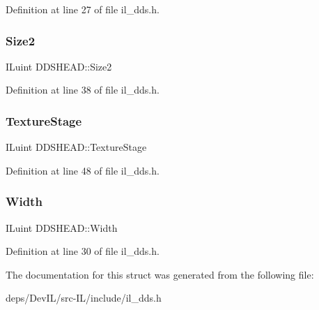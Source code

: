 Definition at line 27 of file il\+\_\+dds.\+h.

\mbox{\label{structDDSHEAD_ae4ee19a87a30c44498acc5f2354a80aa}} 
\subsubsection{\texorpdfstring{Size2}{Size2}}
{\footnotesize\ttfamily I\+Luint D\+D\+S\+H\+E\+A\+D\+::\+Size2}



Definition at line 38 of file il\+\_\+dds.\+h.

\mbox{\label{structDDSHEAD_a961a061539af2d45ffe7df0833b43c46}} 
\subsubsection{\texorpdfstring{Texture\+Stage}{TextureStage}}
{\footnotesize\ttfamily I\+Luint D\+D\+S\+H\+E\+A\+D\+::\+Texture\+Stage}



Definition at line 48 of file il\+\_\+dds.\+h.

\mbox{\label{structDDSHEAD_a5a91cf53282136fb6932a6bb6ab2a767}} 
\subsubsection{\texorpdfstring{Width}{Width}}
{\footnotesize\ttfamily I\+Luint D\+D\+S\+H\+E\+A\+D\+::\+Width}



Definition at line 30 of file il\+\_\+dds.\+h.



The documentation for this struct was generated from the following file\+:\begin{DoxyCompactItemize}
\item 
deps/\+Dev\+I\+L/src-\/\+I\+L/include/il\+\_\+dds.\+h\end{DoxyCompactItemize}
